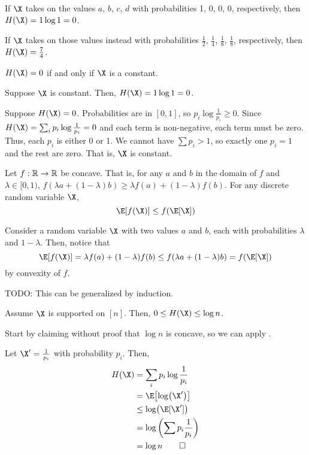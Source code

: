 \documentclass[class=co432,notes,tikz]{agony}
\begin{document}
\begin{example}
  If $\X$ takes on the values $a$, $b$, $c$, $d$
  with probabilities 1, 0, 0, 0, respectively, then $H(\X) = 1 \log 1 = 0$.

  If $\X$ takes on those values instead with probabilities
  $\frac12$, $\frac14$, $\frac18$, $\frac18$, respectively,
  then $H(\X) = \frac74$.
\end{example}

\begin{fact}
  $H(\X) = 0$ if and only if $\X$ is a constant.
\end{fact}
\begin{prf}
  Suppose $\X$ is constant. Then, $H(\X) = 1 \log 1 = 0$.

  Suppose $H(\X) = 0$.
  Probabilities are in $[0,1]$, so $p_i \log \frac{1}{p_i} \geq 0$.
  Since $H(\X) = \sum_i p_i \log \frac{1}{p_i} = 0$
  and each term is non-negative, each term must be zero.
  Thus, each $p_i$ is either 0 or 1.
  We cannot have $\sum p_i > 1$, so exactly one $p_i = 1$ and the rest are zero.
  That is, $\X$ is constant.
\end{prf}

\begin{theorem}\label{thm:jensen}
  Let $f : \mathbb{R} \to \mathbb{R}$ be concave. That is,
  for any $a$ and $b$ in the domain of $f$ and $\lambda \in [0,1)$,
  $f(\lambda a + (1-\lambda)b) \geq \lambda f(a) + (1-\lambda)f(b)$.
  For any discrete random variable $\X$,
  \[ \E[f(\X)] \leq f(\E[\X]) \]
\end{theorem}
\begin{prf}
  Consider a random variable $\X$ with two values $a$ and $b$,
  each with probabilities $\lambda$ and $1-\lambda$.
  Then, notice that
  \[ \E[f(\X)] = \lambda f(a) + (1-\lambda) f(b) \leq f(\lambda a + (1-\lambda)b) = f(\E[\X]) \]
  by convexity of $f$.

  TODO: This can be generalized by induction.
\end{prf}

\begin{fact}
  Assume $\X$ is supported on $[n]$. Then, $0 \leq H(\X) \leq \log n$.
\end{fact}
\begin{prf}
  Start by claiming without proof that $\log n$ is concave, so we can apply
  .

  Let $\X' = \frac{1}{p_i}$ with probability $p_i$. Then,
  \begin{align*}
    H(\X) & = \sum_i p_i \log \frac{1}{p_i}    \\
          & = \E\qty[\log(\X')]                \\
          & \leq \log(\E[\X'])                 \\
          & = \log\qty(\sum p_i \frac{1}{p_i}) \\
          & = \log n \qedhere
  \end{align*}
\end{prf}
\end{document}
